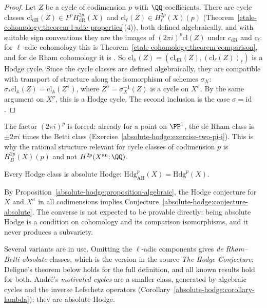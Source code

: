 \begin{proof}
Let $Z$ be a cycle of codimension $p$ with $\QQ$-coefficients. There are cycle classes $\mathrm{cl}_{\mathrm{dR}}(Z) \in F^pH^{2p}_{\mathrm{dR}}(X)$ and $\mathrm{cl}_\ell(Z) \in H^{2p}_\ell(X)(p)$
(Theorem~\ref{etale-cohomology:theorem-l-adic-properties}(4)), both defined algebraically, and with suitable sign conventions they are the images of $(2\pi i)^p\mathrm{cl}(Z)$ under $c_{\mathrm{dR}}$ and $c_\ell$:
for $\ell$-adic cohomology this is Theorem~\ref{etale-cohomology:theorem-comparison}, and for de Rham cohomology it is \cite{deligne-abelian}. So $\mathrm{cl}_{\mathbb{A}}(Z) = (\mathrm{cl}_{\mathrm{dR}}(Z), (\mathrm{cl}_\ell(Z))_\ell)$ is a Hodge cycle. Since the cycle classes are defined algebraically,
they are compatible with transport of structure along the isomorphism of schemes $\sigma_X$: $\sigma_*\mathrm{cl}_{\mathbb{A}}(Z) = \mathrm{cl}_{\mathbb{A}}(Z^\sigma)$, where $Z^\sigma = \sigma_X^{-1}(Z)$ is a cycle on
$X^\sigma$. By the same argument on $X^\sigma$, this is a Hodge cycle. The second inclusion is the case $\sigma = \mathrm{id}$.
\end{proof}

\begin{remark}\label{absolute-hodge:remark-two-pi-i}
The factor $(2\pi i)^p$ is forced: already for a point on $\PP^1$, the de Rham class is $\pm 2\pi i$ times the Betti class (Exercise~\ref{absolute-hodge:exercise-two-pi-i}). This is why the rational
structure relevant for cycle classes of codimension $p$ is $H^{2p}_B(X)(p)$ and not $H^{2p}(X^{\mathrm{an}}; \QQ)$.
\end{remark}

\begin{conjecture}\label{absolute-hodge:conjecture-absolute}
Every Hodge class is absolute Hodge: $\mathrm{Hdg}^p_{\mathrm{AH}}(X) = \mathrm{Hdg}^p(X)$.
\end{conjecture}

By Proposition~\ref{absolute-hodge:proposition-algebraic}, the Hodge conjecture for $X$ and $X^\sigma$ in all codimensions implies Conjecture~\ref{absolute-hodge:conjecture-absolute}. The
converse is not expected to be provable directly: being absolute Hodge is a condition on cohomology and its comparison isomorphisms, and it never produces a subvariety.

\begin{remark}\label{absolute-hodge:remark-de-rham-betti}
Several variants are in use. Omitting the $\ell$-adic components gives \emph{de Rham--Betti absolute} classes, which is the version in the source \emph{The Hodge Conjecture}; Deligne's theorem below holds
for the full definition, and all known results hold for both. Andr\'e's \emph{motivated cycles} \cite{andre-1996-motifs} are a smaller class, generated by algebraic cycles and the inverse Lefschetz
operators (Corollary~\ref{absolute-hodge:corollary-lambda}); they are absolute Hodge.
\end{remark}

